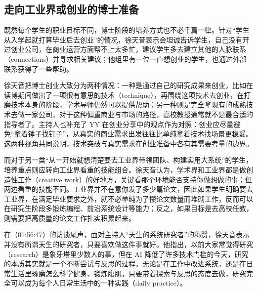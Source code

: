 \documentclass[UTF8,a4paper,11pt,fontset=fandol]{ctexart}
\begin{document}
\subsection{走向工业界或创业的博士准备}
既然每个学生的职业目标不同，博士阶段的培养方式也不必千篇一律。针对“学生从入学起就打算毕业后去创业”的情况，徐天音表示会坦诚告诉学生，自己没有开过创业公司，在商业运营方面帮不上太多忙，建议学生多去建立其他的人脉联系（connections）并寻求相关建议；他组里有一位一直想创业的学生，也通过外部联系获得了一些帮助。

徐天音把博士创业大致分为两种情况：一种是通过自己的研究成果来创业，比如在读博期间做出了一项很有意思的技术（technique），再围绕这项技术去创业，在打磨技术本身的阶段，学术导师仍然可以提供帮助；另一种则是完全拿现有的成熟技术去做一家公司，对于这种偏重商业与市场的路径，高校教授通常就不是最合适的指导者了。主持人也补充了 YY 在创业分享中的观点作为对照：创业应尽量避免“拿着锤子找钉子”，从真实的商业需求出发往往比单纯拿着技术找场景更稳妥。这两种视角共同说明，技术突破与真实需求在创业准备中各有其需要考量的边界。

而对于另一类“从一开始就想清楚要去工业界带领团队、构建实用大系统”的学生，培养重点则应转向工业界看重的技能组合。徐天音认为，学术界和工业界都是做创造性工作（creative work）的好地方，关键看那个环境能否支持你做想做的事；但两边看重的技能不同。工业界并不在意你发了多少篇论文，因此如果学生明确要去工业界，在满足毕业要求之外，就不必单纯为了攒论文数量而堆砌工作，反而可以在研究生阶段多锻炼编程、前沿系统设计等能力；反之，如果目标是去高校任教，则需要把高质量的论文工作扎实积累起来。

在（01:56:47）的访谈尾声，面对主持人“天生的系统研究者”的称赞，徐天音表示并没有所谓天生的研究者，只要喜欢做这件事就好。他指出，以前大家常觉得研究（research）是象牙塔里少数人的事，但在 AI 降低了许多技术门槛的今天，研究的本质其实就是一个不断尝试与反思的过程。无论是在工作中改进系统，还是在日常生活里琢磨怎么科学健身、锻炼腹肌，只要带着探索与反思的态度去做，研究完全可以成为每个人日常生活中的一种实践（daily practice）。
\end{document}
